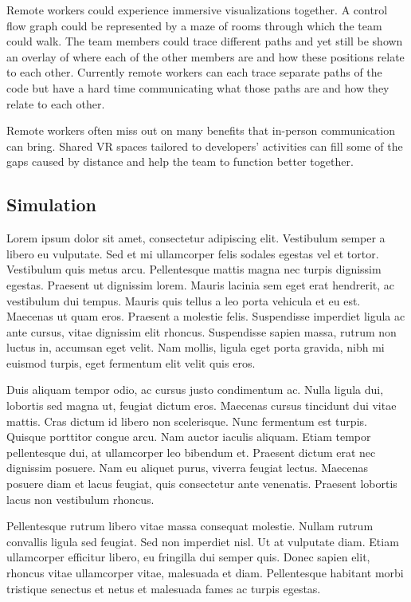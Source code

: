 \documentclass{acm_proc_article-sp}
\begin{document}
Remote workers could experience immersive visualizations together. A control flow graph could be represented by a maze of rooms through which the team could walk. The team members could trace different paths and yet still be shown an overlay of where each of the other members are and how these positions relate to each other. Currently remote workers can each trace separate paths of the code but have a hard time communicating what those paths are and how they relate to each other.

Remote workers often miss out on many benefits that in-person communication can bring. Shared VR spaces tailored to developers' activities can fill some of the gaps caused by distance and help the team to function better together. 

\subsection{Simulation}

Lorem ipsum dolor sit amet, consectetur adipiscing elit. Vestibulum semper a libero eu vulputate. Sed et mi ullamcorper felis sodales egestas vel et tortor. Vestibulum quis metus arcu. Pellentesque mattis magna nec turpis dignissim egestas. Praesent ut dignissim lorem. Mauris lacinia sem eget erat hendrerit, ac vestibulum dui tempus. Mauris quis tellus a leo porta vehicula et eu est. Maecenas ut quam eros. Praesent a molestie felis. Suspendisse imperdiet ligula ac ante cursus, vitae dignissim elit rhoncus. Suspendisse sapien massa, rutrum non luctus in, accumsan eget velit. Nam mollis, ligula eget porta gravida, nibh mi euismod turpis, eget fermentum elit velit quis eros.

Duis aliquam tempor odio, ac cursus justo condimentum ac. Nulla ligula dui, lobortis sed magna ut, feugiat dictum eros. Maecenas cursus tincidunt dui vitae mattis. Cras dictum id libero non scelerisque. Nunc fermentum est turpis. Quisque porttitor congue arcu. Nam auctor iaculis aliquam. Etiam tempor pellentesque dui, at ullamcorper leo bibendum et. Praesent dictum erat nec dignissim posuere. Nam eu aliquet purus, viverra feugiat lectus. Maecenas posuere diam et lacus feugiat, quis consectetur ante venenatis. Praesent lobortis lacus non vestibulum rhoncus.

Pellentesque rutrum libero vitae massa consequat molestie. Nullam rutrum convallis ligula sed feugiat. Sed non imperdiet nisl. Ut at vulputate diam. Etiam ullamcorper efficitur libero, eu fringilla dui semper quis. Donec sapien elit, rhoncus vitae ullamcorper vitae, malesuada et diam. Pellentesque habitant morbi tristique senectus et netus et malesuada fames ac turpis egestas. 
\end{document}
